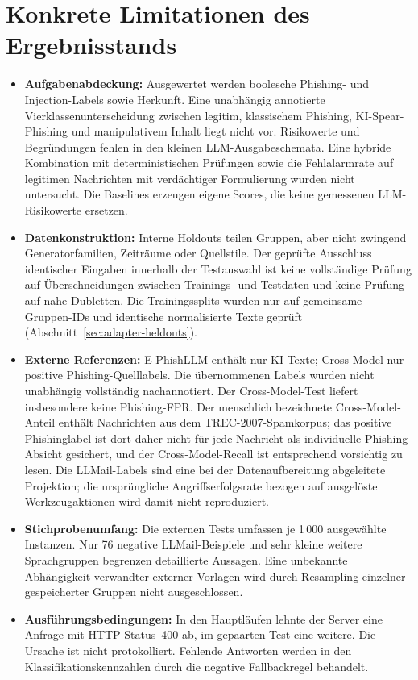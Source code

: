 \documentclass[12pt,twoside=false,a4paper,parskip]{scrbook}
\begin{document}
\section{Konkrete Limitationen des Ergebnisstands}\label{sec:limitationen}

\begin{itemize}
\item \textbf{Aufgabenabdeckung:} Ausgewertet werden boolesche Phishing- und Injection-Labels sowie Herkunft. Eine unabhängig annotierte Vierklassenunterscheidung zwischen legitim, klassischem Phishing, KI-Spear-Phishing und manipulativem Inhalt liegt nicht vor. Risikowerte und Begründungen fehlen in den kleinen LLM-Ausgabeschemata. Eine hybride Kombination mit deterministischen Prüfungen sowie die Fehlalarmrate auf legitimen Nachrichten mit verdächtiger Formulierung wurden nicht untersucht. Die Baselines erzeugen eigene Scores, die keine gemessenen LLM-Risikowerte ersetzen.
\item \textbf{Datenkonstruktion:} Interne Holdouts teilen Gruppen, aber nicht zwingend Generatorfamilien, Zeiträume oder Quellstile. Der geprüfte Ausschluss identischer Eingaben innerhalb der Testauswahl ist keine vollständige Prüfung auf Überschneidungen zwischen Trainings- und Testdaten und keine Prüfung auf nahe Dubletten. Die Trainingssplits wurden nur auf gemeinsame Gruppen-IDs und identische normalisierte Texte geprüft (Abschnitt~\ref{sec:adapter-heldouts}).
\item \textbf{Externe Referenzen:} E-PhishLLM enthält nur KI-Texte; Cross-Model nur positive Phishing-Quelllabels. Die übernommenen Labels wurden nicht unabhängig vollständig nachannotiert. Der Cross-Model-Test liefert insbesondere keine Phishing-FPR. Der menschlich bezeichnete Cross-Model-Anteil enthält Nachrichten aus dem TREC-2007-Spamkorpus; das positive Phishinglabel ist dort daher nicht für jede Nachricht als individuelle Phishing-Absicht gesichert, und der Cross-Model-Recall ist entsprechend vorsichtig zu lesen. Die LLMail-Labels sind eine bei der Datenaufbereitung abgeleitete Projektion; die ursprüngliche Angriffserfolgsrate bezogen auf ausgelöste Werkzeugaktionen wird damit nicht reproduziert.
\item \textbf{Stichprobenumfang:} Die externen Tests umfassen je 1\,000 ausgewählte Instanzen. Nur 76 negative LLMail-Beispiele und sehr kleine weitere Sprachgruppen begrenzen detaillierte Aussagen. Eine unbekannte Abhängigkeit verwandter externer Vorlagen wird durch Resampling einzelner gespeicherter Gruppen nicht ausgeschlossen.
\item \textbf{Ausführungsbedingungen:} In den Hauptläufen lehnte der Server eine Anfrage mit HTTP-Status~400 ab, im gepaarten Test eine weitere. Die Ursache ist nicht protokolliert. Fehlende Antworten werden in den Klassifikationskennzahlen durch die negative Fallbackregel behandelt.

\end{itemize}
\end{document}
